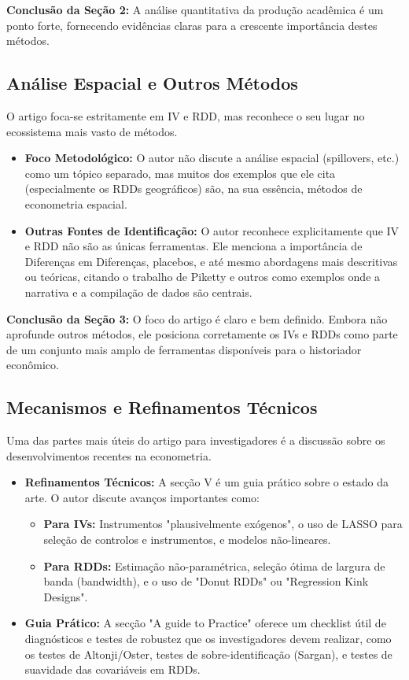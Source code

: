 \documentclass[12pt, a4paper]{article}
\begin{document}
\noindent\textbf{Conclusão da Seção 2:} A análise quantitativa da produção acadêmica é um ponto forte, fornecendo evidências claras para a crescente importância destes métodos. 

\subsection{Análise Espacial e Outros Métodos}
O artigo foca-se estritamente em IV e RDD, mas reconhece o seu lugar no ecossistema mais vasto de métodos.
\begin{itemize}
    \item \textbf{Foco Metodológico:} O autor não discute a análise espacial (spillovers, etc.) como um tópico separado, mas muitos dos exemplos que ele cita (especialmente os RDDs geográficos) são, na sua essência, métodos de econometria espacial.
    \item \textbf{Outras Fontes de Identificação:} O autor reconhece explicitamente que IV e RDD não são as únicas ferramentas. Ele menciona a importância de Diferenças em Diferenças, placebos, e até mesmo abordagens mais descritivas ou teóricas, citando o trabalho de Piketty e outros como exemplos onde a narrativa e a compilação de dados são centrais.
\end{itemize}

\noindent\textbf{Conclusão da Seção 3:} O foco do artigo é claro e bem definido. Embora não aprofunde outros métodos, ele posiciona corretamente os IVs e RDDs como parte de um conjunto mais amplo de ferramentas disponíveis para o historiador econômico.

\subsection{Mecanismos e Refinamentos Técnicos}
Uma das partes mais úteis do artigo para investigadores é a discussão sobre os desenvolvimentos recentes na econometria.
\begin{itemize}
    \item \textbf{Refinamentos Técnicos:} A secção V é um guia prático sobre o estado da arte. O autor discute avanços importantes como:
        \begin{itemize}
            \item \textbf{Para IVs:} Instrumentos "plausivelmente exógenos", o uso de LASSO para seleção de controlos e instrumentos, e modelos não-lineares.
            \item \textbf{Para RDDs:} Estimação não-paramétrica, seleção ótima de largura de banda (bandwidth), e o uso de "Donut RDDs" ou "Regression Kink Designs".
        \end{itemize}
    \item \textbf{Guia Prático:} A secção "A guide to Practice" oferece um checklist útil de diagnósticos e testes de robustez que os investigadores devem realizar, como os testes de Altonji/Oster, testes de sobre-identificação (Sargan), e testes de suavidade das covariáveis em RDDs.
\end{itemize}
\end{document}
